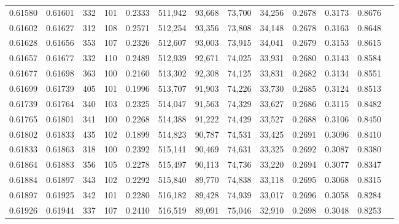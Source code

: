 \begin{tabular}{rrrrrrrrrrrrr}
0.61580 & 0.61601 &   332 & 101 &                                     0.2333 & 511,942 &  93,668 &  73,700 &  34,256 & 0.2678 & 0.3173 & 0.8676 \\
0.61602 & 0.61627 &   312 & 108 &                                     0.2571 & 512,254 &  93,356 &  73,808 &  34,148 & 0.2678 & 0.3163 & 0.8648 \\
0.61628 & 0.61656 &   353 & 107 &                                     0.2326 & 512,607 &  93,003 &  73,915 &  34,041 & 0.2679 & 0.3153 & 0.8615 \\
0.61657 & 0.61677 &   332 & 110 &                                     0.2489 & 512,939 &  92,671 &  74,025 &  33,931 & 0.2680 & 0.3143 & 0.8584 \\
0.61677 & 0.61698 &   363 & 100 &                                     0.2160 & 513,302 &  92,308 &  74,125 &  33,831 & 0.2682 & 0.3134 & 0.8551 \\
0.61699 & 0.61739 &   405 & 101 &                                     0.1996 & 513,707 &  91,903 &  74,226 &  33,730 & 0.2685 & 0.3124 & 0.8513 \\
0.61739 & 0.61764 &   340 & 103 &                                     0.2325 & 514,047 &  91,563 &  74,329 &  33,627 & 0.2686 & 0.3115 & 0.8482 \\
0.61765 & 0.61801 &   341 & 100 &                                     0.2268 & 514,388 &  91,222 &  74,429 &  33,527 & 0.2688 & 0.3106 & 0.8450 \\
0.61802 & 0.61833 &   435 & 102 &                                     0.1899 & 514,823 &  90,787 &  74,531 &  33,425 & 0.2691 & 0.3096 & 0.8410 \\
0.61833 & 0.61863 &   318 & 100 &                                     0.2392 & 515,141 &  90,469 &  74,631 &  33,325 & 0.2692 & 0.3087 & 0.8380 \\
0.61864 & 0.61883 &   356 & 105 &                                     0.2278 & 515,497 &  90,113 &  74,736 &  33,220 & 0.2694 & 0.3077 & 0.8347 \\
0.61884 & 0.61897 &   343 & 102 &                                     0.2292 & 515,840 &  89,770 &  74,838 &  33,118 & 0.2695 & 0.3068 & 0.8315 \\
0.61897 & 0.61925 &   342 & 101 &                                     0.2280 & 516,182 &  89,428 &  74,939 &  33,017 & 0.2696 & 0.3058 & 0.8284 \\
0.61926 & 0.61944 &   337 & 107 &                                     0.2410 & 516,519 &  89,091 &  75,046 &  32,910 & 0.2698 & 0.3048 & 0.8253 \\

\end{tabular}
